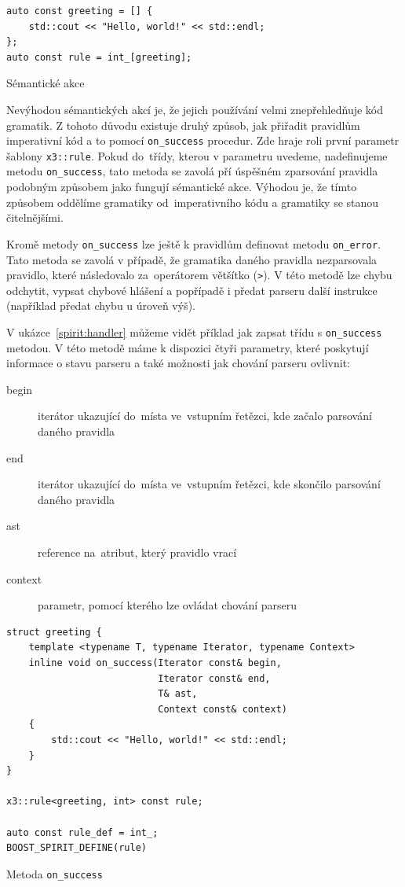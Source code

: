 \documentclass[thesis=B,czech,hidelinks]{FITthesis}[2019/03/06]
\begin{document}
\begin{listing}
\begin{verbatim}
auto const greeting = [] {
    std::cout << "Hello, world!" << std::endl;
};
auto const rule = int_[greeting];
\end{verbatim}
\caption{Sémantické akce}\label{spirit:semantic}
\end{listing}

Nevýhodou sémantických akcí je, že jejich používání velmi znepřehledňuje kód gramatik. Z tohoto důvodu existuje druhý způsob, jak přiřadit pravidlům imperativní kód a to pomocí \verb¨on_success¨ procedur. Zde hraje roli první parametr šablony \texttt{x3::rule}. Pokud do~třídy, kterou v parametru uvedeme, nadefinujeme metodu \verb¨on_success¨, tato metoda se zavolá pří úspěšném zparsování pravidla podobným způsobem jako fungují sémantické akce. Výhodou je, že tímto způsobem oddělíme gramatiky od~imperativního kódu a gramatiky se stanou čitelnějšími.

Kromě metody \verb¨on_success¨ lze ještě k pravidlům definovat metodu \verb¨on_error¨. Tato metoda se zavolá v případě, že gramatika daného pravidla nezparsovala pravidlo, které následovalo za~operátorem většítko (\texttt{>}). V této metodě lze chybu odchytit, vypsat chybové hlášení a popřípadě i předat parseru další instrukce (například předat chybu u úroveň výš).

V ukázce~\ref{spirit:handler} můžeme vidět příklad jak zapsat třídu s \verb¨on_success¨ metodou. V této metodě máme k dispozici čtyři parametry, které poskytují informace o stavu parseru a také možnosti jak chování parseru ovlivnit:
\begin{description}
    \item[begin]{iterátor ukazující do~místa ve~vstupním řetězci, kde začalo parsování daného pravidla}
    \item[end]{iterátor ukazující do~místa ve~vstupním řetězci, kde skončilo parsování daného pravidla}
    \item[ast]{reference na~atribut, který pravidlo vrací}
    \item[context]{parametr, pomocí kterého lze ovládat chování parseru}
\end{description}

\begin{listing}
\begin{verbatim}
struct greeting {
    template <typename T, typename Iterator, typename Context>
    inline void on_success(Iterator const& begin,
                           Iterator const& end,
                           T& ast,
                           Context const& context)
    {
        std::cout << "Hello, world!" << std::endl;
    }
}

x3::rule<greeting, int> const rule;

auto const rule_def = int_;
BOOST_SPIRIT_DEFINE(rule)
\end{verbatim}
\caption{Metoda \texttt{on\_success}}\label{spirit:handler}
\end{listing}
\end{document}
